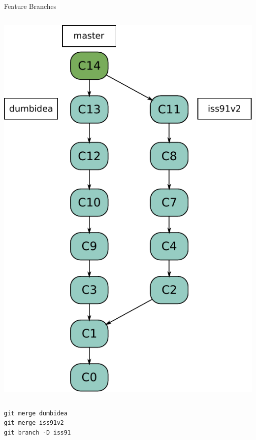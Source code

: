 \begin{frame}{Feature Branches}
\begin{columns}[T]
\begin{column}{.45\textwidth}
\begin{block}{}
        \pause \includegraphics[scale=0.4]{images/feature-branches2.pdf}
    \end{block}
  \end{column}
\end{columns}  
\begin{tiny}
\pause \texttt{git merge dumbidea} \\
\pause \texttt{git merge iss91v2} \\
\pause \texttt{git branch -D iss91} \\
\end{tiny}
\end{frame}

